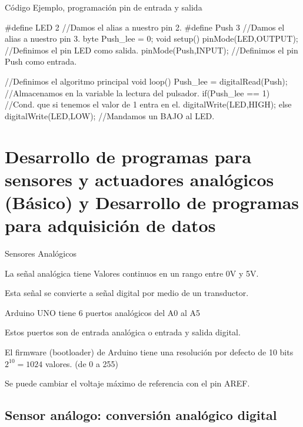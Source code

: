 \documentclass{beamer}
\theoremstyle{definition}
\begin{document}
\begin{frame}[fragile]
{Código Ejemplo, programación pin de entrada y salida}


\tiny

\begin{verbatimtab}

#define LED 2  //Damos el alias a nuestro pin 2.
#define Push 3 //Damos el alias a nuestro pin 3.
byte Push_lee = 0;
void setup(){
	pinMode(LED,OUTPUT); //Definimos el pin LED como salida. 
	pinMode(Push,INPUT); //Definimos el pin Push como entrada. 
}

//Definimos el algoritmo principal
void loop(){
		Push_lee = digitalRead(Push); //Almacenamos en la variable la lectura del 	pulsador.
	if(Push_lee == 1){ 			//Cond. que si tenemos el valor de 1 entra en el.
		digitalWrite(LED,HIGH); 
	}else{
		digitalWrite(LED,LOW); //Mandamos un BAJO al LED.
	}
}

\end{verbatimtab}

\end{frame}


\section{Desarrollo de programas para sensores y actuadores analógicos (Básico) y Desarrollo de programas para adquisici\'on de datos}


\begin{frame}{Sensores Analógicos}

La señal analógica tiene Valores continuos en un rango entre 0V y 5V.

Esta señal se convierte  a señal digital por medio de un transductor.

Arduino UNO tiene 6 puertos analógicos del A0 al A5

Estos puertos son de entrada analógica o entrada y salida digital.

El firmware (bootloader) de Arduino tiene una resolución por defecto de 10 bits $2^{10}=1024$ valores. (de 0 a 255)

Se puede cambiar el voltaje máximo de referencia con el pin AREF.

\end{frame}

\subsection{Sensor análogo: conversión analógico digital}
\end{document}
